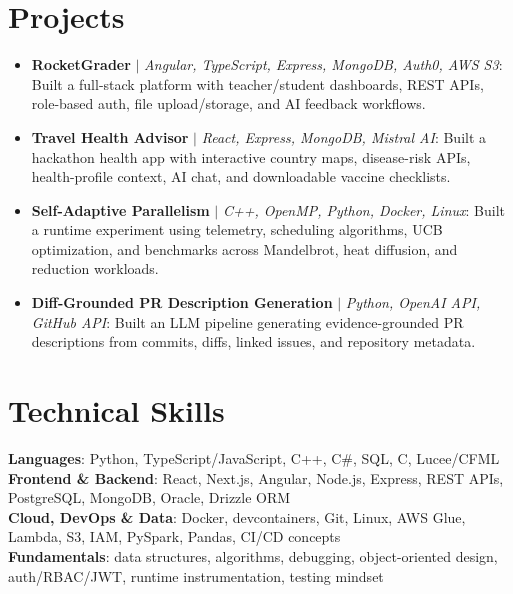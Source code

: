\documentclass[letterpaper,11pt]{article}
\begin{document}
\section{Projects}
\begin{itemize}[leftmargin=0.15in, label={}, itemsep=-2pt, topsep=0pt, parsep=0pt]
  \item\small{\textbf{RocketGrader} $|$ \emph{Angular, TypeScript, Express, MongoDB, Auth0, AWS S3}: Built a full-stack platform with teacher/student dashboards, REST APIs, role-based auth, file upload/storage, and AI feedback workflows.}
  \item\small{\textbf{Travel Health Advisor} $|$ \emph{React, Express, MongoDB, Mistral AI}: Built a hackathon health app with interactive country maps, disease-risk APIs, health-profile context, AI chat, and downloadable vaccine checklists.}
  \item\small{\textbf{Self-Adaptive Parallelism} $|$ \emph{C++, OpenMP, Python, Docker, Linux}: Built a runtime experiment using telemetry, scheduling algorithms, UCB optimization, and benchmarks across Mandelbrot, heat diffusion, and reduction workloads.}
  \item\small{\textbf{Diff-Grounded PR Description Generation} $|$ \emph{Python, OpenAI API, GitHub API}: Built an LLM pipeline generating evidence-grounded PR descriptions from commits, diffs, linked issues, and repository metadata.}
\end{itemize}\vspace{-7pt}

\section{Technical Skills}
 \begin{itemize}[leftmargin=0.15in, label={}]
    \small{\item{
     \textbf{Languages}{: Python, TypeScript/JavaScript, C++, C\#, SQL, C, Lucee/CFML} \\
     \textbf{Frontend \& Backend}{: React, Next.js, Angular, Node.js, Express, REST APIs, PostgreSQL, MongoDB, Oracle, Drizzle ORM} \\
     \textbf{Cloud, DevOps \& Data}{: Docker, devcontainers, Git, Linux, AWS Glue, Lambda, S3, IAM, PySpark, Pandas, CI/CD concepts} \\
     \textbf{Fundamentals}{: data structures, algorithms, debugging, object-oriented design, auth/RBAC/JWT, runtime instrumentation, testing mindset}
    }}
 \end{itemize}
\end{document}
